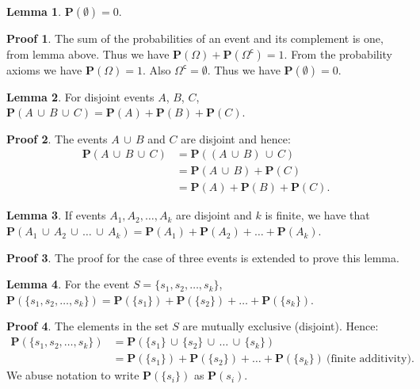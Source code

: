 \documentclass[11pt]{amsart}
\theoremstyle{definition} \newtheorem{thm}{Theorem} \theoremstyle{plain}
\theoremstyle{definition} \newtheorem*{nnthm}{Theorem} \theoremstyle{plain}
\theoremstyle{definition} \newtheorem{lem}{Lemma} \theoremstyle{plain}
\theoremstyle{definition} \newtheorem*{nnlem}{Lemma} \theoremstyle{plain}
\theoremstyle{definition} \newtheorem{prf}{Proof} \theoremstyle{plain}
\theoremstyle{definition} \newtheorem*{nnprf}{Proof} \theoremstyle{plain}
\theoremstyle{definition} \newtheorem{eg}{Example} \theoremstyle{plain}
\theoremstyle{definition} \newtheorem*{sol}{Solution} \theoremstyle{plain}
\newcommand{\setcomp}[1]{{#1}^{\mathsf{c}}}
\newcommand{\prob}[1]{\mathbf{P}(#1)}
\newcommand{\twocup}[2]{{#1} \,\cup\, {#2}}
\newcommand{\threecup}[3]{{#1} \,\cup\, {#2} \,\cup\, {#3}}
\newcommand{\fourcup}[4]{{#1} \,\cup\, {#2} \,\cup\, {#3} \,\cup\, {#4}}
\newcommand{\sngltn}[1]{\{ {#1} \}}
\begin{document}
\begin{lem}
$\prob{\emptyset} = 0$.
\end{lem}
\begin{nnprf}
The sum of the probabilities of an event and its complement is one, from lemma 
above. Thus we have $\prob{\Omega} + \prob{\setcomp{\Omega}} = 1$. From the 
probability axioms we have $\prob{\Omega} = 1$. 
Also $\setcomp{\Omega} = \emptyset$. Thus we have $\prob{\emptyset} = 0$.
\end{nnprf}

\begin{lem}
For disjoint events $A$, $B$, $C$, 
$\prob{\threecup{A}{B}{C}} = \prob{A} + \prob{B} + \prob{C}$.
\end{lem}
\begin{nnprf}
The events $\twocup{A}{B}$ and $C$ are disjoint and hence:
\begin{align*}
\prob{\threecup{A}{B}{C}} & = \prob{\twocup{(\twocup{A}{B})}{C}} \\
                          & = \prob{\twocup{A}{B}} + \prob{C} \\
                          & = \prob{A} + \prob{B} + \prob{C}.
\end{align*}
\end{nnprf}
 

\begin{lem}
If events $A_1, A_2, \ldots, A_k$ are disjoint and $k$ is finite, we have that 
$\prob{\fourcup{A_1}{A_2}{\ldots}{A_k}} = 
\prob{A_1} + \prob{A_2} + \ldots + \prob{A_k}$.
\end{lem}
\begin{nnprf}
The proof for the case of three events is extended to prove this lemma. 
\end{nnprf}

\begin{lem}
For the event $S = \{ s_1, s_2, \ldots, s_k\}$,
$\prob{\{ s_1, s_2, \dots, s_k\}} = \prob{\sngltn{s_1}} + 
\prob{\sngltn{s_2}} + \ldots + \prob{\sngltn{s_k}}$.
\end{lem}
\begin{nnprf}
The elements in the set $S$ are mutually exclusive (disjoint). Hence:
\begin{align*}
\prob{\{ s_1, s_2, \dots, s_k\}} & = 
\prob{\fourcup{\sngltn{s_1}}{\sngltn{s_2}}{\ldots}{\sngltn{s_k}}} \\
& = \prob{\sngltn{s_1}} + \prob{\sngltn{s_2}} + 
    \ldots + \prob{\sngltn{s_k}}~\mbox{(finite additivity)}.
\end{align*} 
We abuse notation to write $\prob{\sngltn{s_i}}$ as $\prob{s_i}$.
\end{nnprf}
\end{document}

